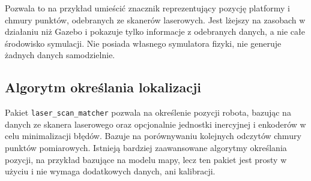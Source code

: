 		Pozwala to na przykład umieścić znacznik reprezentujący pozycję platformy i chmury punktów, odebranych ze skanerów laserowych.
		Jest lżejszy na zasobach w działaniu niż Gazebo i pokazuje tylko informacje z odebranych danych, a nie całe środowisko symulacji.
		Nie posiada własnego symulatora fizyki, nie generuje żadnych danych samodzielnie.
		
	\subsection{Algorytm określania lokalizacji}
		Pakiet \texttt{laser\_scan\_matcher} pozwala na określenie pozycji robota, bazując na danych ze skanera laserowego oraz opcjonalnie jednostki inercyjnej i enkoderów w
		celu minimalizacji błędów. Bazuje na porównywaniu kolejnych odczytów chmury punktów pomiarowych.
		Istnieją bardziej zaawansowane algorytmy określania pozycji, na przykład bazujące na modelu mapy, lecz ten pakiet jest prosty w użyciu i nie wymaga dodatkowych danych, ani kalibracji.
		
	
	
	
	
	

